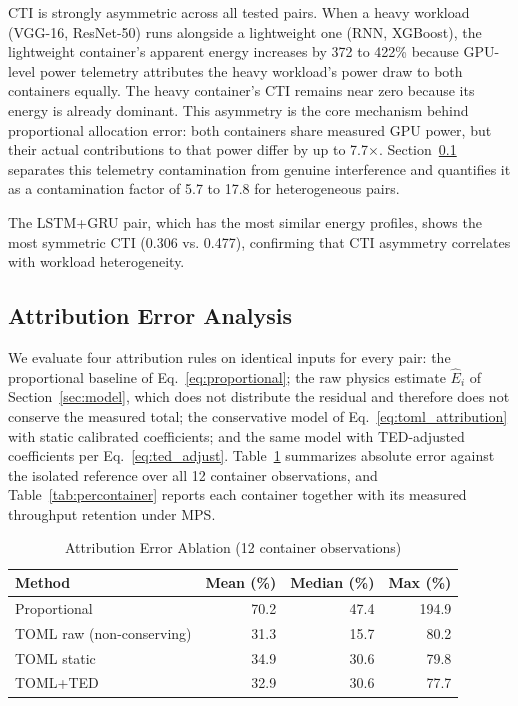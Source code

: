 \documentclass[conference]{IEEEtran}
\begin{document}
CTI is strongly asymmetric across all tested pairs. When a heavy workload (VGG-16, ResNet-50) runs alongside a lightweight one (RNN, XGBoost), the lightweight container's apparent energy increases by 372 to 422\% because GPU-level power telemetry attributes the heavy workload's power draw to both containers equally. The heavy container's CTI remains near zero because its energy is already dominant. This asymmetry is the core mechanism behind proportional allocation error: both containers share measured GPU power, but their actual contributions to that power differ by up to 7.7$\times$. Section~\ref{sec:attribution} separates this telemetry contamination from genuine interference and quantifies it as a contamination factor of 5.7 to 17.8 for heterogeneous pairs.

The LSTM+GRU pair, which has the most similar energy profiles, shows the most symmetric CTI (0.306 vs. 0.477), confirming that CTI asymmetry correlates with workload heterogeneity.

\subsection{Attribution Error Analysis}
\label{sec:attribution}

We evaluate four attribution rules on identical inputs for every pair: the proportional baseline of Eq.~\ref{eq:proportional}; the raw physics estimate $\hat{E}_i$ of Section~\ref{sec:model}, which does not distribute the residual and therefore does not conserve the measured total; the conservative model of Eq.~\ref{eq:toml_attribution} with static calibrated coefficients; and the same model with TED-adjusted coefficients per Eq.~\ref{eq:ted_adjust}. Table~\ref{tab:attribution} summarizes absolute error against the isolated reference over all 12 container observations, and Table~\ref{tab:percontainer} reports each container together with its measured throughput retention under MPS.

\begin{table}[t]
\centering
\caption{Attribution Error Ablation (12 container observations)}
\label{tab:attribution}
\small
\begin{tabular}{lrrr}
\toprule
\textbf{Method} & \textbf{Mean (\%)} & \textbf{Median (\%)} & \textbf{Max (\%)} \\
\midrule
Proportional & 70.2 & 47.4 & 194.9 \\
TOML raw (non-conserving) & 31.3 & 15.7 & 80.2 \\
TOML static & 34.9 & 30.6 & 79.8 \\
TOML+TED & 32.9 & 30.6 & 77.7 \\
\bottomrule
\end{tabular}
\end{table}
\end{document}
